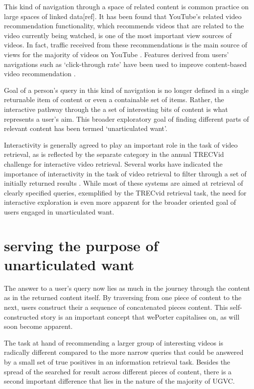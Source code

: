 This kind of navigation through a space of related content is common practice on large spaces of linked data[ref]. It has been found that YouTube's related video recommendation functionality, which recommends videos that are related to the video currently being watched, is one of the most important view sources of videos. In fact, traffic received from these recommendations is the main source of views for the majority of videos on YouTube \cite{Zhou:2010ut}. Features derived from users' navigations such as `click-through rate' have been used to improve content-based video recommendation \cite{Yang:2007vb}.

Goal of a person's query in this kind of navigation is no longer defined in a single returnable item of content or even a containable set of items. Rather, the interactive pathway through the a set of interesting bits of content is what represents a user's aim. This broader exploratory goal of finding different parts of relevant content has been termed `unarticulated want'\cite{Davidson:2010tu}.

Interactivity is generally agreed to play an important role in the task of video retrieval, as is reflected by the separate category in the annual TRECVid challenge for interactive video retrieval\cite{Smeaton:2006ww}. Several works have indicated the importance of interactivity in the task of video retrieval to filter through a set of initially returned results \cite{DeRooij:2007ua, Christel:2004wm, DeRooij:2007ua, DeRooij:2008ut}. While most of these systems are aimed at retrieval of clearly specified queries, exemplified by the TRECvid retrieval task, the need for interactive exploration is even more apparent for the broader oriented goal of users engaged in unarticulated want.

\section{serving the purpose of unarticulated want}
The answer to a user's query now lies as much in the journey through the content as in the returned content itself. By traversing from one piece of content to the next, users construct their a sequence of concatenated pieces content. This self-constructed story is an important concept that wePorter capitalises on, as will soon become apparent.

The task at hand of recommending a larger group of interesting videos is radically different compared to the more narrow queries that could be answered by a small set of true positives in an information retrieval task. Besides the spread of the searched for result across different pieces of content, there is a second important difference that lies in the nature of the majority of UGVC.

